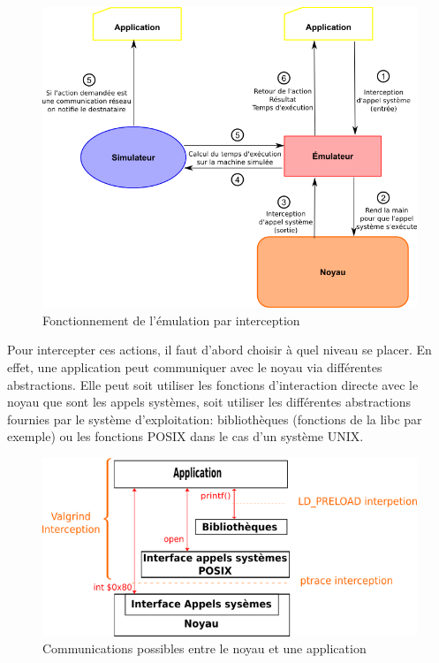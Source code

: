  \begin{figure}
   \centering
   \includegraphics[scale=0.5]{Pictures/png/Emulation_fonctionnement}
   \caption{Fonctionnement de l'émulation par interception}
   \label{INTERCEPTION}
 \end{figure}
 
Pour intercepter ces actions, il faut d'abord choisir à quel niveau se placer.
 En effet, une application peut communiquer avec le noyau via différentes
 abstractions. Elle peut soit utiliser les fonctions d'interaction directe avec
 le noyau que sont les appels systèmes, soit utiliser les différentes
 abstractions fournies par le système d'exploitation: bibliothèques (fonctions
 de la libc par exemple) ou les fonctions POSIX dans le cas d'un système UNIX.

\begin{figure}[H]
 \centering
 \includegraphics[scale=0.75]{Pictures/png/Communication_application_noyau_v3.png}
 \caption{Communications possibles entre le noyau et une application}
 \label{AS_Communication}
\end{figure}

